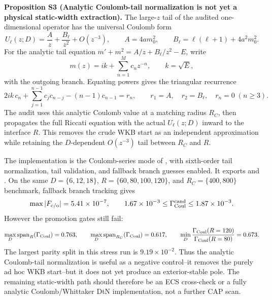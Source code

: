 \documentclass[aps,prd,onecolumn,notitlepage,nofootinbib,superscriptaddress,11pt,floatfix]{revtex4-2}
\begin{document}
\medskip\noindent\textbf{Proposition S3 (Analytic Coulomb-tail normalization is not yet a physical static-width extraction).}
The large-\(z\) tail of the audited one-dimensional operator has the universal Coulomb form
\[
U_\ell(z;D)
=\frac{A}{z}+\frac{B_\ell}{z^2}+O(z^{-3}),\qquad
A=4am_0^2,\qquad
B_\ell=\ell(\ell+1)+4a^2m_0^2 .
\]
For the analytic tail equation \(m'+m^2=A/z+B_\ell/z^2-E\), write
\[
m(z)=ik+\sum_{n=1}^{M} c_n z^{-n},\qquad k=\sqrt{E},
\]
with the outgoing branch.  Equating powers gives the triangular recurrence
\[
2ik\,c_n+\sum_{j=1}^{n-1}c_jc_{n-j}-(n-1)c_{n-1}=r_n,
\qquad
r_1=A,\quad r_2=B_\ell,\quad r_n=0\;(n\ge3).
\]
The audit uses this analytic Coulomb value at a matching radius \(R_C\), then propagates the full Riccati equation with the actual \(U_\ell(z;D)\) inward to the interface \(R\).  This removes the crude WKB start as an independent approximation while retaining the \(D\)-dependent \(O(z^{-3})\) tail between \(R_C\) and \(R\).

The implementation is the Coulomb-series mode of , with sixth-order tail normalization, tail validation, and fallback branch guesses enabled.  It exports  and .  On the same \(D=\{6,12,18\}\), \(R=\{60,80,100,120\}\), and \(R_C=\{400,800\}\) benchmark, fallback branch tracking gives
\[
\max |F_{\rm e/o}|=5.41\times10^{-7},
\qquad
1.67\times10^{-3}\leq \Gamma_{\rm Coul}^{\rm cand}\leq 1.87\times10^{-3}.
\]
However the promotion gates still fail:
\[
\max_D {\rm span}_R(\Gamma_{\rm Coul})=0.763,\qquad
\max_D {\rm span}_{R_C}(\Gamma_{\rm Coul})=0.617,\qquad
\min_D \frac{\Gamma_{\rm Coul}(R=120)}{\Gamma_{\rm Coul}(R=80)}=0.673 .
\]
The largest parity split in this stress run is \(9.19\times10^{-2}\).  Thus the analytic Coulomb-tail normalization is useful as a negative control--it removes the purely ad hoc WKB start--but it does not yet produce an exterior-stable pole.  The remaining static-width path should therefore be an ECS cross-check or a fully analytic Coulomb/Whittaker DtN implementation, not a further CAP scan.
\end{document}
